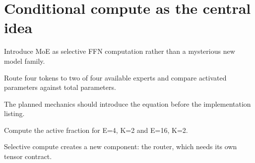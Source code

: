 \section{Conditional compute as the central idea}
\label{sec:ch01-conditional-compute-as-the-central-idea}

Introduce MoE as selective FFN computation rather than a mysterious new model family.



Route four tokens to two of four available experts and compare activated parameters against total parameters.



The planned mechanics should introduce the equation before the implementation listing.





\begin{checkpointbox}
Compute the active fraction for E=4, K=2 and E=16, K=2.
\end{checkpointbox}

Selective compute creates a new component: the router, which needs its own tensor contract.
